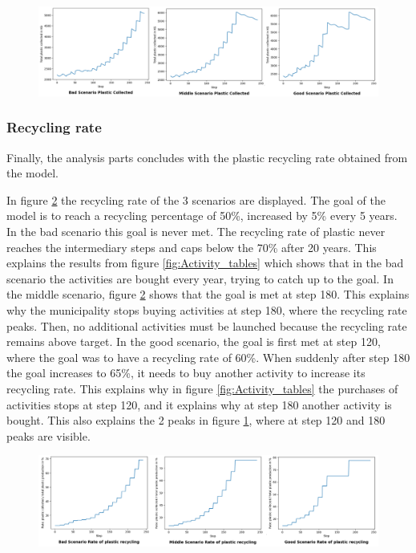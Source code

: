 \begin{figure}[H]
    \centering
        \captionsetup{width=\linewidth}
        \includegraphics[width=1.0\linewidth]{Images/Collected_plastic_graphs.png}
        \caption{}
    \label{fig:Plastic_collected}
\end{figure}

\subsubsection{Recycling rate}
\noindent Finally, the analysis parts concludes with the plastic recycling rate obtained from the model. 

\noindent In figure \ref{fig:Recycling_rate_plastic} the recycling rate of the 3 scenarios are displayed. The goal of the model is to reach a recycling percentage of 50\%, increased by 5\% every 5 years. In the bad scenario this goal is never met. The recycling rate of plastic never reaches the intermediary steps and caps below the 70\% after 20 years. This explains the results from figure \ref{fig:Activity_tables} which shows that in the bad scenario the activities are bought every year, trying to catch up to the goal. In the middle scenario, figure \ref{fig:Recycling_rate_plastic} shows that the goal is met at step 180. This explains why the municipality stops buying activities at step 180, where the recycling rate peaks. Then, no additional activities must be launched because the recycling rate remains above target. In the good scenario, the goal is first met at step 120, where the goal was to have a recycling rate of 60\%. When suddenly after step 180 the goal increases to 65\%, it needs to buy another activity to increase its recycling rate. This explains why in figure \ref{fig:Activity_tables} the purchases of activities stops at step 120, and it explains why at step 180 another activity is bought. This also explains the 2 peaks in figure \ref{fig:Plastic_collected}, where at step 120 and 180 peaks are visible. 

\begin{figure}[H]
    \centering
        \captionsetup{width=\linewidth}
        \includegraphics[width=1.0\linewidth]{Images/Recyclingrate_plastic_graphs.png}
        \caption{}
    \label{fig:Recycling_rate_plastic}
\end{figure}
